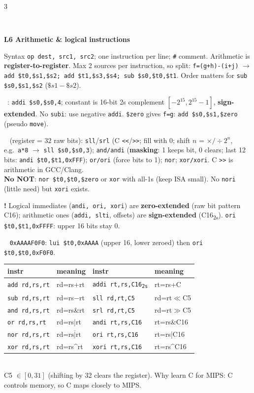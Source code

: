 \documentclass[landscape]{article}
\newcommand{\sect}[1]{\par\vspace{2pt}\noindent{\color{cur}\rule[-1.5pt]{\linewidth}{0.4pt}}\\[-7.5pt]%
  \noindent\colorbox{cur!12}{\parbox{\dimexpr\linewidth-2\fboxsep}{\color{cur}\bfseries #1}}\par\vspace{0.5pt}}
\newcommand{\sub}[1]{\par\vspace{1pt}{\color{cur}\bfseries #1}\ }
\newcommand{\key}[1]{\textbf{\color{BrickRed}#1}}
\newcommand{\warn}[1]{\par\noindent\colorbox{red!10}{\parbox{\dimexpr\linewidth-2\fboxsep}{\textcolor{red!70!black}{\textbf{!} } #1}}\par}
\newcommand{\tc}[1]{\texttt{#1}}
\begin{document}
\begin{multicols*}{3}
\sect{L6 \; Arithmetic \& logical instructions}
Syntax \tc{op dest, src1, src2}; one instruction per line; \tc{\#} comment. Arithmetic is \key{register-to-register}. Max 2 sources per instruction, so split: \tc{f=(g+h)-(i+j)} $\to$ \tc{add \$t0,\$s1,\$s2; add \$t1,\$s3,\$s4; sub \$s0,\$t0,\$t1}. Order matters for \tc{sub \$s0,\$s1,\$s2} ($\$s1-\$s2$).\\
\sub{Immediates}: \tc{addi \$s0,\$s0,4}; constant is 16-bit 2s complement $[-2^{15},2^{15}-1]$, \key{sign-extended}. No \tc{subi}: use negative \tc{addi}. \tc{\$zero} gives \tc{f=g}: \tc{add \$s0,\$s1,\$zero} (pseudo \tc{move}).\\
\sub{Logical} (register = 32 raw bits): \tc{sll}/\tc{srl} (C \tc{<<}/\tc{>>}; fill with 0; shift $n$ = $\times/\div 2^n$, e.g.\ \tc{a*8} $\to$ \tc{sll \$s0,\$s0,3}); \tc{and/andi} (\key{masking}: 1 keeps bit, 0 clears; last 12 bits: \tc{andi \$t0,\$t1,0xFFF}); \tc{or/ori} (force bits to 1); \tc{nor}; \tc{xor/xori}. C \tc{>>} is arithmetic in GCC/Clang.\\
\key{No NOT}: \tc{nor \$t0,\$t0,\$zero} or \tc{xor} with all-1s (keep ISA small). No \tc{nori} (little need) but \tc{xori} exists.\\
\warn{Logical immediates (\tc{andi, ori, xori}) are \key{zero-extended} (raw bit pattern C16); arithmetic ones (\tc{addi, slti}, offsets) are \key{sign-extended} (C16\textsubscript{2s}). \tc{ori \$t0,\$t1,0xFFFF}: upper 16 bits stay 0.}
\sub{Large constant} \tc{0xAAAAF0F0}: \tc{lui \$t0,0xAAAA} (upper 16, lower zeroed) then \tc{ori \$t0,\$t0,0xF0F0}.\\
\begin{tabular}{@{}ll|ll@{}}\toprule
instr & meaning & instr & meaning\\\midrule
\tc{add rd,rs,rt} & rd=rs+rt & \tc{addi rt,rs,C16\textsubscript{2s}} & rt=rs+C\\
\tc{sub rd,rs,rt} & rd=rs$-$rt & \tc{sll rd,rt,C5} & rd=rt$\ll$C5\\
\tc{and rd,rs,rt} & rd=rs\&rt & \tc{srl rd,rt,C5} & rd=rt$\gg$C5\\
\tc{or rd,rs,rt} & rd=rs|rt & \tc{andi rt,rs,C16} & rt=rs\&C16\\
\tc{nor rd,rs,rt} & rd=$\overline{\text{rs|rt}}$ & \tc{ori rt,rs,C16} & rt=rs|C16\\
\tc{xor rd,rs,rt} & rd=rs\^{}rt & \tc{xori rt,rs,C16} & rt=rs\^{}C16\\\bottomrule
\end{tabular}\\
C5 $\in[0,31]$ (shifting by 32 clears the register). Why learn C for MIPS: C controls memory, so C maps closely to MIPS.


\end{multicols*}
\end{document}
